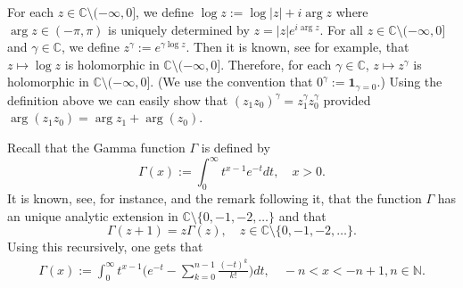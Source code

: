 \documentclass[12pt,a4paper]{amsart}
\theoremstyle{plain}
\theoremstyle{definition}
\numberwithin{equation}{section}
\begin{document}
	For each $z\in \mathbb C\setminus (-\infty,0]$, we define
$
	\log z := \log |z| + i \arg z
$
	where $\arg z \in (-\pi,\pi)$ is uniquely determined by
$
	z = |z|e^{i \arg z}.
$ 	
	For all $z\in \mathbb C\setminus (-\infty,0]$ and $\gamma \in \mathbb C$, we define
$
	z^\gamma := e^{\gamma \log z}.
$
	Then it is known, see \cite[Theorem 6.1]{SteinShakarchi2003Complex} for example, that $z\mapsto \log z$ is holomorphic in $\mathbb C\setminus (-\infty,0]$.
	Therefore, for each $\gamma \in \mathbb C$, $z\mapsto z^\gamma$ is holomorphic in $\mathbb C\setminus (-\infty,0]$.
(We use the convention that  $0^\gamma := \mathbf 1_{\gamma = 0}$.)
   Using  the definition above we can easily show that $(z_1z_0)^\gamma = z_1^\gamma z_0^\gamma$ provided $\arg (z_1z_0)=\arg z_1 + \arg(z_0)$.

 Recall that the Gamma function  $\Gamma$ is defined by
\begin{equation}
    \Gamma (x) := \int_0^\infty t^{x-1} e^{-t}dt,
    \quad x>0.
\end{equation}
	It is known, see, for instance, \cite[Theorem 6.1.3]{SteinShakarchi2003Complex} and the remark following it, that the function $\Gamma$ has an unique analytic extension in $\mathbb C\setminus\{0, -1,-2,\dots\}$ and that
\[
	\Gamma(z+1) = z \Gamma(z),\quad z\in \mathbb C\setminus\{0, -1,-2,\dots\}.
\]
	Using this recursively, one gets that
\begin{equation}\begin{split}
\label{eq: definition of Gamma function}
    \Gamma(x)
    := \int_0^\infty t^{x-1} \Big(e^{-t} - \sum_{k=0}^{n-1} \frac{(-t)^k}{k!}\Big) dt,
    \quad -n< x< -n+1, n\in \mathbb N.
\end{split}\end{equation}
\end{document}
